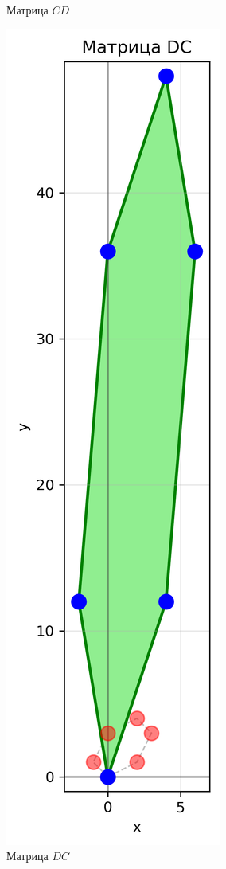 \begin{figure}[h]
\begin{minipage}{0.23\textwidth}
\caption{Матрица $CD$}
\label{fig:matrix_CD}
\end{minipage}
\hfill
\begin{minipage}{0.23\textwidth}
\centering
\includegraphics[width=\textwidth]{images/task1/matrix_DC.png}
\caption{Матрица $DC$}
\label{fig:matrix_DC}
\end{minipage}
\end{figure}


